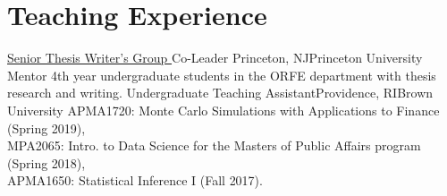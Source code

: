 \documentclass[10pt,a4paper,roman]{moderncv}        %
\begin{document}
\vspace{-0.3cm}
\section{Teaching Experience}
{\color{blue}\href{https://orfe.princeton.edu/undergraduate/stwg}{Senior Thesis
    Writer's Group }\color{black} Co-Leader}
{Princeton, NJ}{Princeton University}
{Mentor 4th year undergraduate students in the ORFE department with thesis research and writing.}
{Undergraduate Teaching Assistant}{Providence, RI}{Brown University}
{APMA1720: Monte Carlo Simulations with Applications to Finance (Spring 2019), \\
MPA2065: Intro. to Data Science for the Masters of Public Affairs program (Spring 2018),
\\
APMA1650: Statistical Inference I (Fall 2017).
}

\end{document}
